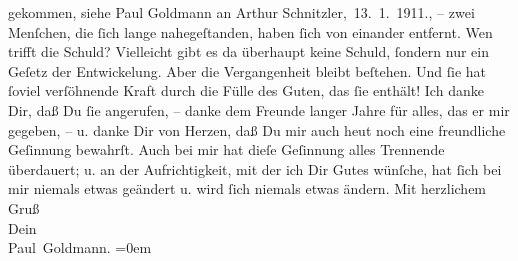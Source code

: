 \begin{ledgroupsized}[t]{13cm}
{{{                  gekommen, siehe Paul Goldmann an Arthur Schnitzler, 13. 1. 1911.}}}\label{K_L03477-2h}, –
               zwei Menſchen, die ſich lange nahegeſtanden, haben ſich von einander entfernt. Wen
               trifft die Schuld? Vielleicht gibt es da überhaupt keine Schuld, ſondern nur ein
               Geſetz der Entwickelung.\pend
           \pstart
           Aber die Vergangenheit {\pb}bleibt beſtehen. Und ſie
               hat ſoviel verſöhnende Kraft durch die Fülle des Guten, das ſie enthält! Ich danke
               Dir, daß Du ſie angerufen, – danke dem Freunde langer Jahre für alles, das er mir
               gegeben, – u. danke Dir von Herzen, daß Du mir auch heut noch eine freundliche
               Geſinnung bewahrſt. Auch bei mir hat dieſe Geſinnung alles Trennende überdauert; {\pb}u. an der Aufrichtigkeit, mit der ich Dir Gutes
               wünſche, hat ſich bei mir niemals etwas geändert u. wird ſich niemals etwas
               ändern.\pend
           \pstart
           Mit herzlichem Gruß {\\[\baselineskip]}Dein {\\[\baselineskip]}\spacefill\mbox{Paul Goldmann.}\pend
           \leftskip=0em{}
         
         \endnumbering{}\end{ledgroupsized}  \newcommand{\dateiname}{L03477}\newcommand{\titel}{Paul Goldmann an Arthur Schnitzler, 10. 2. 1915}\newcommand{\editorInnen}{Martin Anton Müller und Laura Untner}
      